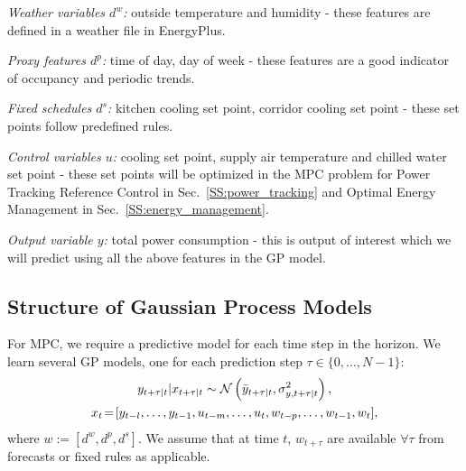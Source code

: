 \textit{Weather variables \(d^w\):} outside temperature and humidity - these features are defined in a weather file in EnergyPlus.

\textit{Proxy features \(d^p\):} time of day, day of week - these features are a good indicator of occupancy and periodic trends.

\textit{Fixed schedules  \(d^s\):} kitchen cooling set point, corridor cooling set point - these set points follow predefined rules. 

\textit{Control variables \(u\):} cooling set point, supply air temperature and chilled water set point - these set points will be optimized in the MPC problem for Power Tracking Reference Control in Sec.~\ref{SS:power_tracking} and Optimal Energy Management in Sec.~\ref{SS:energy_management}.

\textit{Output variable \(y\):} total power consumption - this is output of interest which we will predict using all the above features in the GP model.

\subsection{Structure of  Gaussian Process Models}

For MPC, we require a predictive model for each time step in the horizon.
We learn several GP models, one for each prediction step \( \tau \in \{0,\dots,N-1\}\):
\begin{gather}
\label{E:gp:casestudy}
y_{t+\tau|t} | x_{t+\tau|t} \sim \GaussianDist{\bar{y}_{t+\tau|t}}{\sigma^2_{y,t+\tau|t}}, \\
x_{t}\!=\![y_{t-l}, \dots, y_{t-1}, u_{t-m}, \dots, u_t, w_{t-p}, \dots, w_{t-1}, w_t], \nonumber
\end{gather}
where \(w:=[d^w, d^p, d^s]\). We assume that at time \(t\), \(w_{t+\tau}\) are available \(\forall \tau \) from forecasts or fixed rules as applicable.


